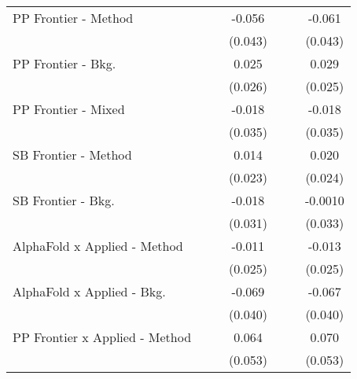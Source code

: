 \begin{tabular}{lcccccc}
   PP Frontier - Method           &                &              & -0.056      &                &              & -0.061\\   
                                  &                &              & (0.043)     &                &              & (0.043)\\   
   PP Frontier - Bkg.             &                &              & 0.025       &                &              & 0.029\\   
                                  &                &              & (0.026)     &                &              & (0.025)\\   
   PP Frontier - Mixed            &                &              & -0.018      &                &              & -0.018\\   
                                  &                &              & (0.035)     &                &              & (0.035)\\   
   SB Frontier - Method           &                &              & 0.014       &                &              & 0.020\\   
                                  &                &              & (0.023)     &                &              & (0.024)\\   
   SB Frontier - Bkg.             &                &              & -0.018      &                &              & -0.0010\\   
                                  &                &              & (0.031)     &                &              & (0.033)\\   
   AlphaFold x Applied - Method   &                &              & -0.011      &                &              & -0.013\\   
                                  &                &              & (0.025)     &                &              & (0.025)\\   
   AlphaFold x Applied - Bkg.     &                &              & -0.069      &                &              & -0.067\\   
                                  &                &              & (0.040)     &                &              & (0.040)\\   
   PP Frontier x Applied - Method &                &              & 0.064       &                &              & 0.070\\   
                                  &                &              & (0.053)     &                &              & (0.053)\\   

\end{tabular}
